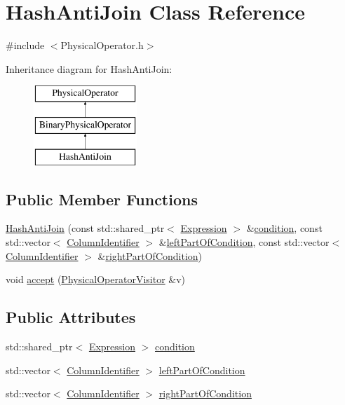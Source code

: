 \hypertarget{class_hash_anti_join}{\section{Hash\+Anti\+Join Class Reference}
\label{class_hash_anti_join}
}


{\ttfamily \#include $<$Physical\+Operator.\+h$>$}

Inheritance diagram for Hash\+Anti\+Join\+:\begin{figure}[H]
\begin{center}
\leavevmode
\includegraphics[height=3.000000cm]{class_hash_anti_join}
\end{center}
\end{figure}
\subsection*{Public Member Functions}
\begin{DoxyCompactItemize}
\item 
\hyperlink{class_hash_anti_join_ad10f79cc90f48e784fda6618e28b1f60}{Hash\+Anti\+Join} (const std\+::shared\+\_\+ptr$<$ \hyperlink{class_expression}{Expression} $>$ \&\hyperlink{class_hash_anti_join_a94f542040c9ee014a520ddf0b9267ff2}{condition}, const std\+::vector$<$ \hyperlink{class_column_identifier}{Column\+Identifier} $>$ \&\hyperlink{class_hash_anti_join_a7f63b0f5f9cbcde2c6c8819d25b0b68d}{left\+Part\+Of\+Condition}, const std\+::vector$<$ \hyperlink{class_column_identifier}{Column\+Identifier} $>$ \&\hyperlink{class_hash_anti_join_a7dc5742715a982de107f7703ef01d95b}{right\+Part\+Of\+Condition})
\item 
void \hyperlink{class_hash_anti_join_a8a629e5592d9a42ce155dd83f7f551d0}{accept} (\hyperlink{class_physical_operator_visitor}{Physical\+Operator\+Visitor} \&v)
\end{DoxyCompactItemize}
\subsection*{Public Attributes}
\begin{DoxyCompactItemize}
\item 
std\+::shared\+\_\+ptr$<$ \hyperlink{class_expression}{Expression} $>$ \hyperlink{class_hash_anti_join_a94f542040c9ee014a520ddf0b9267ff2}{condition}
\item 
std\+::vector$<$ \hyperlink{class_column_identifier}{Column\+Identifier} $>$ \hyperlink{class_hash_anti_join_a7f63b0f5f9cbcde2c6c8819d25b0b68d}{left\+Part\+Of\+Condition}
\item 
std\+::vector$<$ \hyperlink{class_column_identifier}{Column\+Identifier} $>$ \hyperlink{class_hash_anti_join_a7dc5742715a982de107f7703ef01d95b}{right\+Part\+Of\+Condition}
\end{DoxyCompactItemize}


